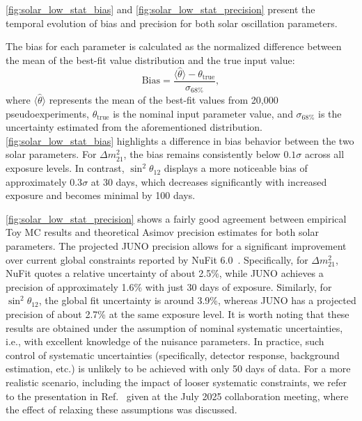 \autoref{fig:solar_low_stat_bias} and \autoref{fig:solar_low_stat_precision} present the temporal evolution of bias and precision for both solar oscillation parameters. 

The bias for each parameter is calculated as the normalized difference between the mean of the best-fit value distribution and the true input value: 
\begin{equation}
    \text{Bias} = \frac{\langle\hat{\theta}\rangle - \theta_{\text{true}}}{\sigma_{\text{68\%}}},
\end{equation}
where $\langle\hat{\theta}\rangle$ represents the mean of the best-fit values from 20,000 pseudoexperiments, $\theta_{\text{true}}$ is the nominal input parameter value, and $\sigma_{\text{68\%}}$ is the uncertainty estimated from the aforementioned distribution. \autoref{fig:solar_low_stat_bias} highlights a difference in bias behavior between the two solar parameters. For $\Delta m^2_{21}$, the bias remains consistently below $0.1\sigma$ across all exposure levels. In contrast, $\sin^2\theta_{12}$ displays a more noticeable bias of approximately $0.3\sigma$ at 30 days, which decreases significantly with increased exposure and becomes minimal by 100 days. 


\autoref{fig:solar_low_stat_precision} shows a fairly good agreement between empirical Toy MC results and theoretical Asimov precision estimates for both solar parameters. The projected JUNO precision allows for a significant improvement over current global constraints reported by NuFit 6.0~\cite{Nufit:2024eli}. Specifically, for $\Delta m^2_{21}$, NuFit quotes a relative uncertainty of about 2.5\%, while JUNO achieves a precision of approximately 1.6\% with just 30 days of exposure. Similarly, for $\sin^2\theta_{12}$, the global fit uncertainty is around 3.9\%, whereas JUNO has a projected precision of about 2.7\% at the same exposure level. It is worth noting that these results are obtained under the assumption of nominal systematic uncertainties, i.e., with excellent knowledge of the nuisance parameters. In practice, such control of systematic uncertainties (specifically, detector response, background estimation, etc.) is unlikely to be achieved with only 50 days of data. For a more realistic scenario, including the impact of looser systematic constraints, we refer to the presentation in Ref.~\cite{docdb:julyCMtfreport} given at the July 2025 collaboration meeting, where the effect of relaxing these assumptions was discussed.

